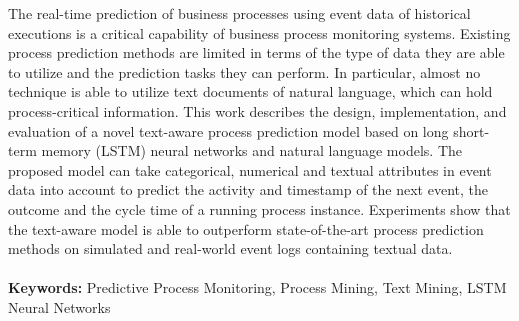 The real-time prediction of business processes using event data of historical executions is a critical capability of business process monitoring systems.
Existing process prediction methods are limited in terms of the type of data they are able to utilize and the prediction tasks they can perform.
In particular, almost no technique is able to utilize text documents of natural language, which can hold process-critical information.
This work describes the design, implementation, and evaluation of a novel text-aware process prediction model based on long short-term memory (LSTM) neural networks and natural language models.
The proposed model can take categorical, numerical and textual attributes in event data into account to predict the activity and timestamp of the next event, the outcome and the cycle time of a running process instance.
Experiments show that the text-aware model is able to outperform state-of-the-art process prediction methods on simulated and real-world event logs containing textual data.
\\\\
\textbf{Keywords:} Predictive Process Monitoring, Process Mining, Text Mining, LSTM Neural Networks